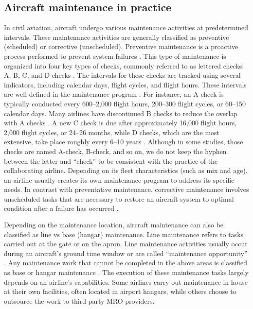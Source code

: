 \subsection{Aircraft maintenance in practice }
\label{aircraft_maint_practice}
In civil aviation, aircraft undergo various maintenance activities at predetermined intervals. These maintenance activities are generally classified as preventive (scheduled) or corrective (unscheduled). 
Preventive maintenance is a proactive process performed to prevent system failures \citep{van2013aircraft,tseremoglou2024condition}. This type of maintenance is organized into four key types of checks, commonly referred to as lettered checks: A, B, C, and D checks \citep{preventive_vs_on-condition}. The intervals for these checks are tracked using several indicators, including calendar days, flight cycles, and flight hours. These intervals are well defined in the maintenance program \citep{icao2019aircraft}. For instance, an A check is typically conducted every 600–2,000 flight hours, 200–300 flight cycles, or 60–150 calendar days. Many airlines have discontinued B checks to reduce the overlap with A checks \citep{lagos2020dynamic}. A new C check is due after approximately 16,000 flight hours, 2,000 flight cycles, or 24–26 months, while D checks, which are the most extensive, take place roughly every 6–10 years \citep{naatypesofaviationmaint}. Although in some studies, those checks are named A-check, B-check, and so on, we do not keep the hyphen between the letter and ``check'' to be consistent with the practice of the collaborating airline. \color{black} Depending on its fleet characteristics (such as mix and age), an airline usually creates its own maintenance program to address its specific needs. In contrast with preventative maintenance, corrective maintenance involves unscheduled tasks that are necessary to restore an aircraft system to optimal condition after a failure has occurred \citep{eddarhri2022towards}.

Depending on the maintenance location, aircraft maintenance can also be classified as line vs base (hangar) maintenance. Line maintenance refers to tasks carried out at the gate or on the apron.  Line maintenance activities usually occur during an aircraft's ground time window or are called ``maintenance opportunity'' \citep{villafranca2025aircraft}. \color{black}  Any maintenance work that cannot be completed in the above areas is classified as base or hangar maintenance \citep{van2013aircraft}. The execution of these maintenance tasks largely depends on an airline's capabilities. Some airlines carry out maintenance in-house at their own facilities, often located in airport hangars, while others choose to outsource the work to third-party MRO providers.


